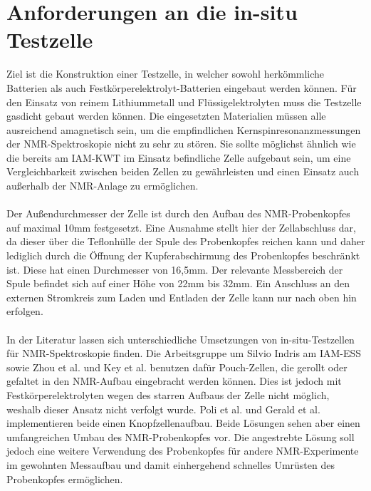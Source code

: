 \documentclass[a4paper, 11pt, headsepline,footsepline,twoside,abstract]{scrbook}
\begin{document}
\section{Anforderungen an die in-situ Testzelle}
Ziel ist die Konstruktion einer Testzelle, in welcher sowohl herkömmliche Batterien als auch Festkörperelektrolyt-Batterien eingebaut werden können. Für den Einsatz von reinem Lithium\-metall und Flüssigelektrolyten muss die Testzelle gasdicht gebaut werden können. Die eingesetzten Materialien müssen alle ausreichend amagnetisch sein, um die empfindlichen Kernspinresonanzmessungen der NMR-Spektroskopie nicht zu sehr zu stören. Sie sollte möglichst ähnlich wie die bereits am IAM-KWT im Einsatz befindliche Zelle aufgebaut sein, um eine Vergleichbarkeit zwischen beiden Zellen zu gewährleisten und einen Einsatz auch außerhalb der NMR-Anlage zu ermöglichen. 
\\\\
Der Außendurchmesser der Zelle ist durch den Aufbau des NMR-Probenkopfes auf maximal 10mm festgesetzt. Eine Ausnahme stellt hier der Zellabschluss dar, da dieser über die Teflonhülle der Spule des Probenkopfes reichen kann und daher lediglich durch die Öffnung der Kupferabschirmung des Probenkopfes beschränkt ist. Diese hat einen Durchmesser von 16,5mm. Der relevante Messbereich der Spule befindet sich auf einer Höhe von 22mm bis 32mm. Ein Anschluss an den externen Stromkreis zum Laden und Entladen der Zelle kann nur nach oben hin erfolgen.
\\\\
In der Literatur lassen sich unterschiedliche Umsetzungen von in-situ-Testzellen für NMR-Spektroskopie finden. Die Arbeitsgruppe um Silvio Indris am IAM-ESS sowie Zhou et al. \cite{zhou2013paramagnetic} und Key et al. \cite{key2009real} benutzen dafür Pouch-Zellen, die gerollt oder gefaltet in den NMR-Aufbau eingebracht werden können. Dies ist jedoch mit Festkörperelektrolyten wegen des starren Aufbaus der Zelle nicht möglich, weshalb dieser Ansatz nicht verfolgt wurde.  Poli et al. \cite{poli2011new} und Gerald et al. \cite{gerald2001situ} implementieren beide einen Knopfzellenaufbau. Beide Lösungen sehen aber einen umfangreichen Umbau des NMR-Probenkopfes vor. Die angestrebte Lösung soll jedoch eine weitere Verwendung des Probenkopfes für andere NMR-Experimente im gewohnten Messaufbau und damit einhergehend schnelles Umrüsten des Probenkopfes ermöglichen.
\end{document}
